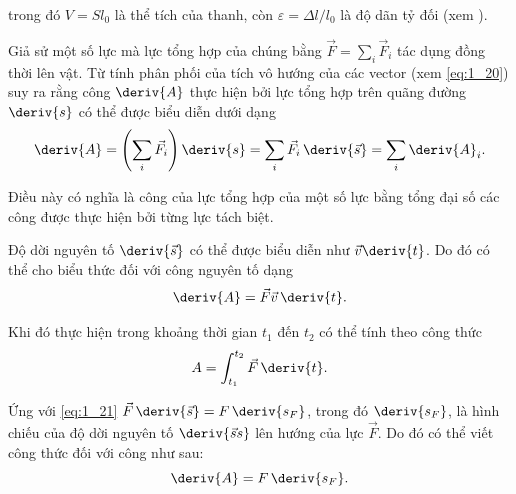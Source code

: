\noindent
trong đó $V=Sl_0$ là thể tích của thanh, còn $\varepsilon=\Delta l/l_0$ là độ dãn tỷ đối (xem ).

Giả sử một số lực mà    lực tổng hợp của chúng bằng  $\vec{F}=\sum_{i}\vec{F}_i$ tác dụng đồng thời lên vật. Từ tính phân phối của tích vô hướng của các vector  (xem \eqref{eq:1_20}) suy ra rằng công $\deriv{A}$ thực hiện bởi lực tổng hợp trên quãng đường $\deriv{s}$ có thể được biểu diễn dưới dạng
\begin{equation}\label{eq:3_15}
\deriv{A} = \left(\sum_{i}\vec{F}_i\right)\deriv{s} = \sum_{i}\vec{F}_i\,\deriv{\vec{s}} = \sum_{i}\deriv{A}_i.
\end{equation}

\noindent
Điều này có nghĩa là công của lực tổng hợp của một số lực bằng tổng đại số các công được thực hiện bởi từng lực tách biệt.

Độ dời nguyên tố $\deriv{\vec{s}}$ có thể được biểu diễn như $\vec{v}\deriv{t}$. Do đó có thể cho biểu thức đối với công nguyên tố dạng
\begin{equation}\label{eq:3_16}
\deriv{A} = \vec{F}\vec{v}\,\deriv{t}.
\end{equation}

\noindent
Khi đó thực hiện trong khoảng thời gian $t_1$ đến $t_2$ có thể tính theo công thức
\begin{equation}\label{eq:3_17}
A = \int_{t_1}^{t_2}\vec{F}\,\deriv{t}.
\end{equation}

Ứng với \eqref{eq:1_21} $\vec{F}\,\deriv{\vec{s}}=F\,\deriv{s_F}$, trong đó $\deriv{s_F}$, là hình chiếu của độ dời nguyên tố $\deriv{\vec{s}s}$ lên hướng của lực $\vec{F}$. Do đó có thể viết công thức đối với công như sau:
\begin{equation}\label{eq:3_18}
\deriv{A} = F\,\deriv{s_F}.
\end{equation}

